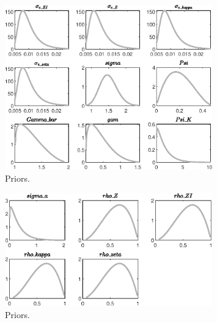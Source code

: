  
\begin{figure}[H]
\centering
\includegraphics[width=0.80\textwidth]{directed_search_simp_est/graphs/directed_search_simp_est_Priors1}
\caption{Priors.}\label{Fig:Priors:1}
\end{figure}
\begin{figure}[H]
\centering
\includegraphics[width=0.80\textwidth]{directed_search_simp_est/graphs/directed_search_simp_est_Priors2}
\caption{Priors.}\label{Fig:Priors:2}
\end{figure}
 
